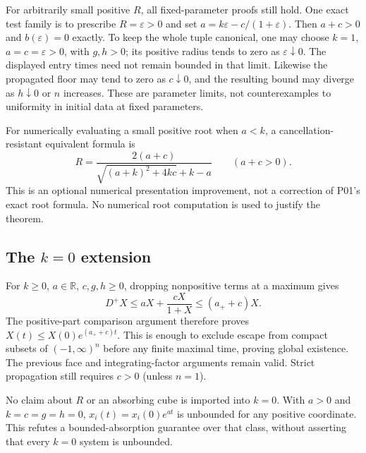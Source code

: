 \documentclass[11pt]{article}
\newcommand{\RR}{\mathbb R}
\newcommand{\Dom}{(-1,\infty)^n}
\begin{document}
For arbitrarily small positive $R$, all fixed-parameter proofs still
hold. One exact test family is to prescribe $R=\varepsilon>0$ and set
$a=k\varepsilon-c/(1+\varepsilon)$. Then $a+c>0$ and $b(\varepsilon)=0$
exactly. To keep the whole tuple canonical, one may choose
$k=1$, $a=c=\varepsilon>0$, with $g,h>0$; its positive radius tends
to zero as $\varepsilon\downarrow0$. The displayed entry times need
not remain bounded in that limit. Likewise the propagated floor may
tend to zero as $c\downarrow0$, and the resulting bound may diverge
as $h\downarrow0$ or $n$ increases. These are parameter limits, not
counterexamples to uniformity in initial data at fixed parameters.

For numerically evaluating a small positive root when $a<k$, a
cancellation-resistant equivalent formula is
\[
 R=\frac{2(a+c)}{\sqrt{(a+k)^2+4kc}+k-a}\qquad(a+c>0).
\]
This is an optional numerical presentation improvement, not a correction
of P01's exact root formula. No numerical root computation is used to
justify the theorem.

\subsection{The \texorpdfstring{$k=0$}{k=0} extension}
For $k\geq0$, $a\in\RR$, $c,g,h\geq0$, dropping nonpositive terms at
a maximum gives
\[
 D^+X\leq aX+\frac{cX}{1+X}\leq(a_++c)X.
\]
The positive-part comparison argument therefore proves
$X(t)\leq X(0)e^{(a_++c)t}$. This is enough to exclude escape from
compact subsets of $\Dom$ before any finite maximal time, proving
global existence. The previous face and integrating-factor arguments
remain valid. Strict propagation still requires $c>0$ (unless $n=1$).

No claim about $R$ or an absorbing cube is imported into $k=0$.
With $a>0$ and $k=c=g=h=0$, $x_i(t)=x_i(0)e^{at}$ is unbounded for
any positive coordinate. This refutes a bounded-absorption guarantee
over that class, without asserting that every $k=0$ system is unbounded.
\end{document}
